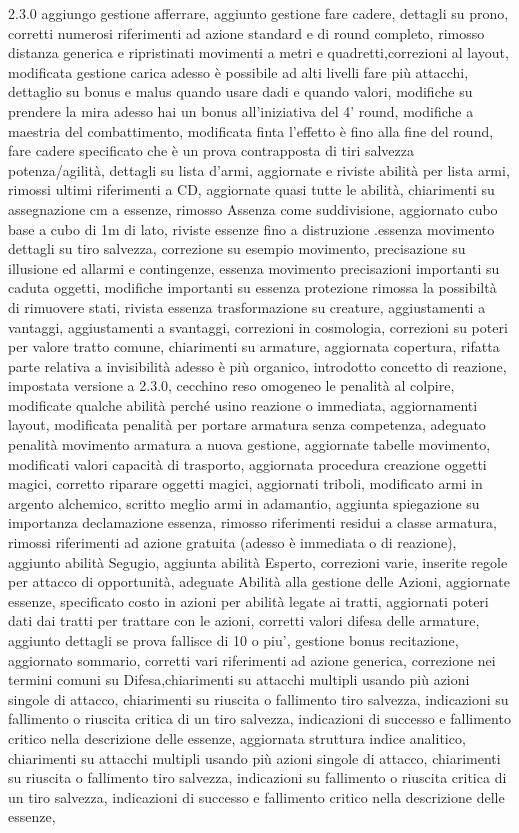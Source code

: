 \documentclass[a4paper,11pt,twoside,openany]{book}
\begin{document}
{	2.3.0 aggiungo gestione afferrare, aggiunto gestione fare cadere, dettagli su prono, corretti numerosi riferimenti ad azione standard e di round completo, rimosso distanza generica e ripristinati movimenti a metri e quadretti,correzioni al layout, modificata gestione carica adesso è possibile ad alti livelli fare più attacchi, dettaglio su bonus e malus quando usare dadi e quando valori, modifiche su prendere la mira adesso hai un bonus all'iniziativa del 4' round, modifiche a maestria del combattimento, modificata finta l'effetto è fino alla fine del round, fare cadere specificato che è un prova contrapposta di tiri salvezza potenza/agilità, dettagli su lista d'armi, aggiornate e riviste abilità per lista armi, rimossi ultimi riferimenti a CD, aggiornate quasi tutte le abilità, chiarimenti su assegnazione cm a essenze, rimosso Assenza come suddivisione, aggiornato cubo base a cubo di 1m di lato, riviste essenze fino a distruzione .essenza movimento dettagli su tiro salvezza, correzione su esempio movimento, precisazione su illusione ed allarmi e contingenze, essenza movimento precisazioni importanti su caduta oggetti, modifiche importanti su essenza protezione rimossa la possibiltà di rimuovere stati, rivista essenza trasformazione su creature, aggiustamenti a vantaggi, aggiustamenti a svantaggi, correzioni in cosmologia, correzioni su poteri per valore tratto comune, chiarimenti su armature, aggiornata copertura, rifatta parte relativa a invisibilità adesso è più organico, introdotto concetto di reazione, impostata versione a 2.3.0, cecchino reso omogeneo le penalità al colpire, modificate qualche abilità perché usino reazione o immediata, aggiornamenti layout, modificata penalità per portare armatura senza competenza, adeguato penalità movimento armatura a nuova gestione, aggiornate tabelle movimento, modificati valori capacità di trasporto, aggiornata procedura creazione oggetti magici, corretto riparare oggetti magici, aggiornati triboli, modificato armi in argento alchemico, scritto meglio armi in adamantio, aggiunta spiegazione su importanza declamazione essenza, rimosso riferimenti residui a classe armatura, rimossi riferimenti ad azione gratuita (adesso è immediata o di reazione), aggiunto abilità Segugio, aggiunta abilità Esperto, correzioni varie, inserite regole per attacco di opportunità, adeguate Abilità alla gestione delle Azioni, aggiornate essenze, specificato costo in azioni per abilità legate ai tratti, aggiornati poteri dati dai tratti per trattare con le azioni, corretti valori difesa delle armature, aggiunto dettagli se prova fallisce di 10 o piu', gestione bonus recitazione, aggiornato sommario, corretti vari riferimenti ad azione generica, correzione nei termini comuni su Difesa,chiarimenti su attacchi multipli usando più azioni singole di attacco, chiarimenti su riuscita o fallimento tiro salvezza, indicazioni su fallimento o riuscita critica di un tiro salvezza, indicazioni di successo e fallimento critico nella descrizione delle essenze, aggiornata struttura indice analitico, chiarimenti su attacchi multipli usando più azioni singole di attacco, chiarimenti su riuscita o fallimento tiro salvezza, indicazioni su fallimento o riuscita critica di un tiro salvezza, indicazioni di successo e fallimento critico nella descrizione delle essenze, }
\end{document}
